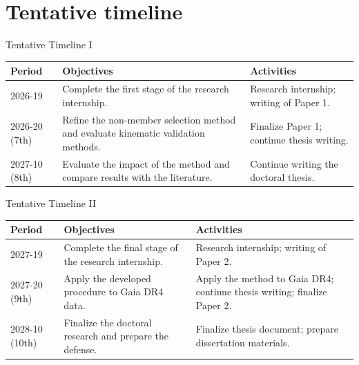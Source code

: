 \documentclass{beamer}
\begin{document}
\section{Tentative timeline}

\begin{frame}{Tentative Timeline I}
\small
\renewcommand{\arraystretch}{1.25}

\begin{tabularx}{\textwidth}{p{2.4cm}X X}
\toprule
\textbf{Period} & \textbf{Objectives} & \textbf{Activities} \\
\midrule

2026-19 &
Complete the first stage of the research internship. &
Research internship; writing of Paper 1. \\

2026-20 (7th) &
Refine the non-member selection method and evaluate kinematic validation methods. &
Finalize Paper 1; continue thesis writing. \\

2027-10 (8th) &
Evaluate the impact of the method and compare results with the literature. &
Continue writing the doctoral thesis. \\

\bottomrule
\end{tabularx}

\end{frame}
\begin{frame}{Tentative Timeline II}
\small
\renewcommand{\arraystretch}{1.25}

\begin{tabularx}{\textwidth}{p{2.4cm}X X}
\toprule
\textbf{Period} & \textbf{Objectives} & \textbf{Activities} \\
\midrule

2027-19 &
Complete the final stage of the research internship. &
Research internship; writing of Paper 2. \\

2027-20 (9th) &
Apply the developed procedure to Gaia DR4 data. &
Apply the method to Gaia DR4; continue thesis writing; finalize Paper 2. \\

2028-10 (10th) &
Finalize the doctoral research and prepare the defense. &
Finalize thesis document; prepare dissertation materials. \\

\bottomrule
\end{tabularx}

\end{frame}
\end{document}

